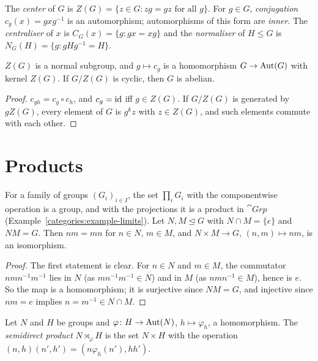 \begin{definition}\label{groups:definition-center-conjugation}
The \emph{center} of $G$ is $Z(G) = \{z \in G : zg = gz \text{ for all } g\}$. For
$g \in G$, \emph{conjugation} $c_g(x) = gxg^{-1}$ is an automorphism; automorphisms
of this form are \emph{inner}. The \emph{centraliser} of $x$ is
$C_G(x) = \{g : gx = xg\}$ and the \emph{normaliser} of $H \leq G$ is
$N_G(H) = \{g : gHg^{-1} = H\}$.
\end{definition}

\begin{lemma}\label{groups:lemma-center-cyclic}
$Z(G)$ is a normal subgroup, and $g \mapsto c_g$ is a homomorphism
$G \to \operatorname{Aut}(G)$ with kernel $Z(G)$. If $G/Z(G)$ is cyclic, then $G$ is abelian.
\end{lemma}

\begin{proof}
$c_{gh} = c_g \circ c_h$, and $c_g = \mathrm{id}$ iff $g \in Z(G)$. If $G/Z(G)$ is generated
by $gZ(G)$, every element of $G$ is $g^k z$ with $z \in Z(G)$, and such elements
commute with each other.
\end{proof}

\section{Products}\label{groups:section-products}

\begin{proposition}\label{groups:proposition-products}
For a family of groups $(G_i)_{i \in I}$, the set $\prod_i G_i$ with the componentwise
operation is a group, and with the projections it is a product in $\cat{Grp}$
(Example~\ref{categories:example-limits}). Let $N, M \trianglelefteq G$ with
$N \cap M = \{e\}$ and $NM = G$. Then $nm = mn$ for $n \in N$, $m \in M$, and
$N \times M \to G$, $(n, m) \mapsto nm$, is an isomorphism.
\end{proposition}

\begin{proof}
The first statement is clear. For $n \in N$ and $m \in M$, the commutator
$nmn^{-1}m^{-1}$ lies in $N$ (as $mn^{-1}m^{-1} \in N$) and in $M$ (as
$nmn^{-1} \in M$), hence is $e$. So the map is a homomorphism; it is surjective
since $NM = G$, and injective since $nm = e$ implies $n = m^{-1} \in N \cap M$.
\end{proof}

\begin{definition}\label{groups:definition-semidirect}
Let $N$ and $H$ be groups and $\varphi \colon H \to \operatorname{Aut}(N)$, $h \mapsto \varphi_h$, a
homomorphism. The \emph{semidirect product} $N \rtimes_\varphi H$ is the set
$N \times H$ with the operation $(n, h)(n', h') = (n\varphi_h(n'), hh')$.
\end{definition}

